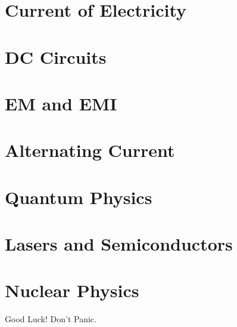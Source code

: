 \documentclass[a4paper]{article}
\begin{document}
	\section{Current of Electricity}
	\section{DC Circuits}
	\section{EM and EMI}
	\section{Alternating Current}
	\section{Quantum Physics}
	\section{Lasers and Semiconductors}
	\section{Nuclear Physics}
	
	\begin{center}
		{\Huge Good Luck! Don't Panic.}
	\end{center}
\end{document}
